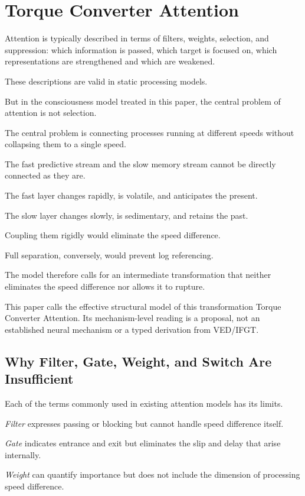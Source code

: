 \section{Torque Converter Attention}


Attention is typically described in terms of filters, weights, selection, and suppression: which information is passed, which target is focused on, which representations are strengthened and which are weakened.

These descriptions are valid in static processing models.

But in the consciousness model treated in this paper, the central problem of attention is not selection.

The central problem is connecting processes running at different speeds without collapsing them to a single speed.

The fast predictive stream and the slow memory stream cannot be directly connected as they are.

The fast layer changes rapidly, is volatile, and anticipates the present.

The slow layer changes slowly, is sedimentary, and retains the past.

Coupling them rigidly would eliminate the speed difference.

Full separation, conversely, would prevent log referencing.

The model therefore calls for an intermediate transformation that neither eliminates the speed difference nor allows it to rupture.

This paper calls the effective structural model of this transformation Torque Converter Attention. Its mechanism-level reading is a proposal, not an established neural mechanism or a typed derivation from VED/IFGT.

\subsection{Why Filter, Gate, Weight, and Switch Are Insufficient}


Each of the terms commonly used in existing attention models has its limits.

\emph{Filter} expresses passing or blocking but cannot handle speed difference itself.

\emph{Gate} indicates entrance and exit but eliminates the slip and delay that arise internally.

\emph{Weight} can quantify importance but does not include the dimension of processing speed difference.

